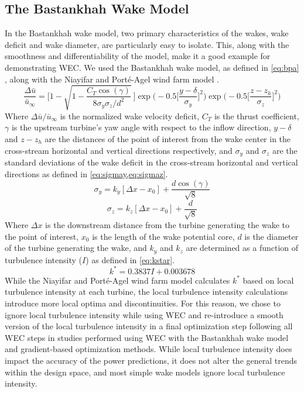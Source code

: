 \documentclass{jpconf}
\begin{document}
\subsection{The Bastankhah Wake Model}
In the Bastankhah wake model, two primary characteristics of the wakes, wake deficit and wake diameter, are particularly easy to isolate. This, along with the smoothness and differentiability of the model, make it a good example for demonstrating WEC. We used the Bastankhah wake model, as defined in \cref{eq:bpa} \cite{bastankhah2016}, along with the Niayifar and Port\'e-Agel wind farm model \cite{niayifar2016}.
%
\begin{equation}
	\frac{\Delta \bar{u}}{\bar{u}_{\infty}} = \Bigg[1-\sqrt{1-\frac{C_T \cos{(\gamma)}}{8 \sigma_y \sigma_z/d^2}}~\Bigg] \exp{\bigg(-0.5\Big[\frac{y-\delta}{\sigma_y}\Big]^2\bigg)}\exp{\bigg(-0.5\Big[\frac{z-z_h}{\sigma_z}\Big]^2\bigg)}
	 \label{eq:bpa}
\end{equation}
%
Where $\Delta \bar{u} / \bar{u}_{\infty}$ is the normalized wake velocity deficit, $C_T$ is the thrust coefficient, $\gamma$ is the upstream turbine's yaw angle with respect to the inflow direction, $y-\delta$ and $z-z_h$ are the distances of the point of interest from the wake center in the cross-stream horizontal and vertical directions respectively, and $\sigma_y$ and $\sigma_z$ are the standard deviations of the wake deficit in the cross-stream horizontal and vertical directions as defined in \cref{eq:sigmay,eq:sigmaz}.
%
\begin{equation}\label{eq:sigmay}
	\sigma_y = k_y [\Delta x - x_0] + \frac{d \cos{(\gamma)}}{\sqrt{8}}
\end{equation}
%
\begin{equation}\label{eq:sigmaz}
	\sigma_z = k_z [\Delta x - x_0] + \frac{d}{\sqrt{8}}
\end{equation}
%
Where $\Delta x$ is the downstream distance from the turbine generating the wake to the point of interest, $x_0$ is the length of the wake potential core, $d$ is the diameter of the turbine generating the wake, and $k_y$ and $k_z$ are determined as a function of turbulence intensity ($I$) as defined in \cref{eq:kstar}\cite{niayifar2016}.
%
\begin{equation}\label{eq:kstar}
	k^* = 0.3837I + 0.003678
\end{equation}
%
While the Niayifar and Port\'e-Agel wind farm model calculates $k^*$ based on local turbulence intensity at each turbine, the local turbulence intensity calculations introduce more local optima and discontinuities. For this reason, we chose to ignore local turbulence intensity while using WEC and re-introduce a smooth version of the local turbulence intensity in a final optimization step following all WEC steps in studies performed using WEC with the Bastankhah wake model and gradient-based optimization methods. While local turbulence intensity does impact the accuracy of the power predictions, it does not alter the general trends within the design space, and most simple wake models ignore local turbulence intensity. 
\end{document}
